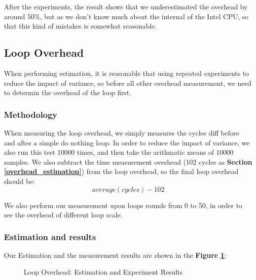 After the experiments, the result shows that we underestimated the overhead by around 50\%, but as we don't know much about the internal of the Intel CPU, so that this kind of mistakes is somewhat reasonable.

\subsection{Loop Overhead}
When performing estimation, it is reasonable that using repeated experiments to reduce the impact of variance, so before all other overhead measurement, we need to determin the overhead of the loop first.

\subsubsection{Methodology}

When measuring the loop overhead, we simply measures the cycles diff before and after a simple do nothing loop. In order to reduce the impact of variance, we also run this test 10000 times, and then take the arithmatic
means of 10000 samples. We also subtract the time measurement overhead (102 cycles as \textbf{Section \ref{overhead_estimation}}) from the loop overhead, so the final loop overhead should be:
    $$ average(cycles) - 102 $$

We also perform our measurement upon loops rounds from 0 to 50, in order to see the overhead of different loop scale.

\subsubsection{Estimation and results}

Our Estimation and the measurement results are shown in the \textbf{Figure \ref{loop_overhead_result}}:

\begin{figure}[ht]
    \centering
    \caption{Loop Overhead: Estimation and Experiment Results }
    \label{loop_overhead_result}
\end{figure}

